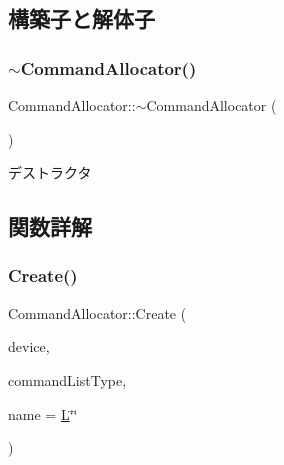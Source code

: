 \subsection{構築子と解体子}
\mbox{\label{class_command_allocator_a2c03013b9d9a5147b6d505803252ea7a}} 
\subsubsection{\texorpdfstring{$\sim$\+Command\+Allocator()}{~CommandAllocator()}}
{\footnotesize\ttfamily Command\+Allocator\+::$\sim$\+Command\+Allocator (\begin{DoxyParamCaption}{ }\end{DoxyParamCaption})}



デストラクタ 



\subsection{関数詳解}
\mbox{\label{class_command_allocator_af7c1081a0fc5d36b36f6c99e3fbe8128}} 
\subsubsection{\texorpdfstring{Create()}{Create()}}
{\footnotesize\ttfamily Command\+Allocator\+::\+Create (\begin{DoxyParamCaption}\item[{std\+::shared\+\_\+ptr$<$ \mbox{\hyperlink{class_device}{Device}} $>$}]{device,  }\item[{D3\+D12\+\_\+\+C\+O\+M\+M\+A\+N\+D\+\_\+\+L\+I\+S\+T\+\_\+\+T\+Y\+PE}]{command\+List\+Type,  }\item[{const std\+::wstring \&}]{name = {\ttfamily \mbox{\hyperlink{_keyboard_8h_a50f7749e42959062d6f7ee3df6a2fd93ad20caec3b48a1eef164cb4ca81ba2587}{L}}\char`\"{}\char`\"{}} }\end{DoxyParamCaption})\hspace{0.3cm}{\ttfamily [static]}}

